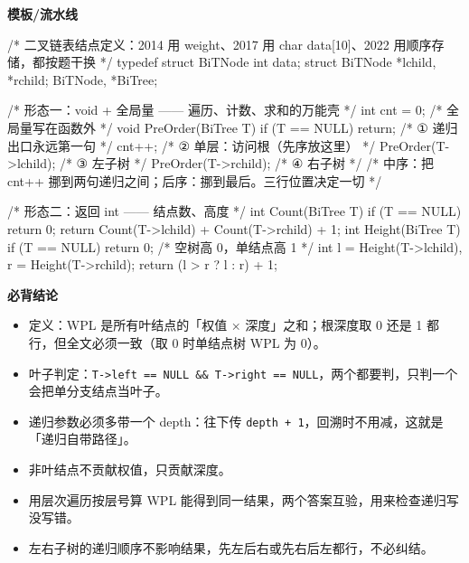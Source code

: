 \documentclass[10pt,a4paper]{ctexart}
\begin{document}
\textbf{模板/流水线}

\begin{codebox}
/* 二叉链表结点定义：2014 用 weight、2017 用 char data[10]、2022 用顺序存储，都按题干换 */
typedef struct BiTNode {
    int data;
    struct BiTNode *lchild, *rchild;
} BiTNode, *BiTree;

/* 形态一：void + 全局量 —— 遍历、计数、求和的万能壳 */
int cnt = 0;                               /* 全局量写在函数外 */
void PreOrder(BiTree T) {
    if (T == NULL) return;                 /* ① 递归出口永远第一句 */
    cnt++;                                 /* ② 单层：访问根（先序放这里） */
    PreOrder(T->lchild);                   /* ③ 左子树 */
    PreOrder(T->rchild);                   /* ④ 右子树 */
}
/* 中序：把 cnt++ 挪到两句递归之间；后序：挪到最后。三行位置决定一切 */

/* 形态二：返回 int —— 结点数、高度 */
int Count(BiTree T) {
    if (T == NULL) return 0;
    return Count(T->lchild) + Count(T->rchild) + 1;
}
int Height(BiTree T) {
    if (T == NULL) return 0;               /* 空树高 0，单结点高 1 */
    int l = Height(T->lchild), r = Height(T->rchild);
    return (l > r ? l : r) + 1;
}
\end{codebox}





\textbf{必背结论}

\begin{itemize}

\item 定义：WPL 是所有叶结点的「权值 × 深度」之和；根深度取 0 还是 1 都行，但全文必须一致（取 0 时单结点树 WPL 为 0）。

\item 叶子判定：\texttt{T->left == NULL \&\& T->right == NULL}，两个都要判，只判一个会把单分支结点当叶子。

\item 递归参数必须多带一个 depth：往下传 \texttt{depth + 1}，回溯时不用减，这就是「递归自带路径」。

\item 非叶结点不贡献权值，只贡献深度。

\item 用层次遍历按层号算 WPL 能得到同一结果，两个答案互验，用来检查递归写没写错。

\item 左右子树的递归顺序不影响结果，先左后右或先右后左都行，不必纠结。

\end{itemize}
\end{document}
